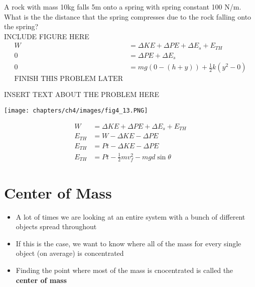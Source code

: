 \begin{problem}
    A rock with mass 10kg falls 5m onto a spring with spring constant 100 N/m. What is the the distance that the spring compresses due to the rock falling onto the spring?\\
    
    INCLUDE FIGURE HERE\\

    $$
    \begin{aligned}
        W &= \Delta KE + \Delta PE + \Delta E_s + E_{TH}\\
        0 &= \Delta PE + \Delta E_s\\
        0 &= mg(0-(h+y))+\frac{1}{2}k(y^2-0)\\
        \text{FINISH THIS PROBLEM LATER}
    \end{aligned}
    $$
\end{problem}


\begin{problem}
    INSERT TEXT ABOUT THE PROBLEM HERE

    \begin{center}
        \texttt{[image: chapters/ch4/images/fig4\_13.PNG]}
    \end{center}

    $$
    \begin{aligned}
        W &= \Delta KE + \Delta PE +\Delta E_s + E_{TH}\\
        E_{TH} &= W - \Delta KE - \Delta PE\\
        E_{TH} &= Pt - \Delta KE - \Delta PE\\
        E_{TH} &= Pt - \frac{1}{2}mv_f^2 - mgd\sin\theta
    \end{aligned}
    $$
\end{problem}



\section{Center of Mass}

\begin{itemize}
    \item A lot of times we are looking at an entire system with a bunch of different objects spread throughout
    \item If this is the case, we want to know where all of the mass for every single object (on average) is concentrated
    \item Finding the point where most of the mass is cnocentrated is called the \textbf{center of mass}
\end{itemize}


